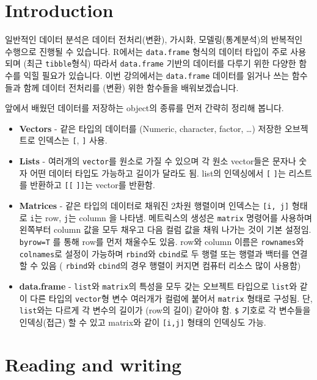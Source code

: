 \documentclass[
  a4paper,
]{book}
\providecommand{\tightlist}{%
  \setlength{\itemsep}{0pt}\setlength{\parskip}{0pt}}\usepackage{longtable,booktabs,array}
\begin{document}
\hypertarget{introduction-2}{%
\section{Introduction}\label{introduction-2}}

일반적인 데이터 분석은 데이터 전처리(변환), 가시화, 모델링(통계분석)의
반복적인 수행으로 진행될 수 있습니다. R에서는 \texttt{data.frame} 형식의
데이터 타입이 주로 사용되며 (최근 \texttt{tibble}형식) 따라서
\texttt{data.frame} 기반의 데이터를 다루기 위한 다양한 함수를 익힐
필요가 있습니다. 이번 강의에서는 \texttt{data.frame} 데이터를 읽거나
쓰는 함수들과 함께 데이터 전처리를 (변환) 위한 함수들을 배워보겠습니다.

앞에서 배웠던 데이터를 저장하는 object의 종류를 먼저 간략히 정리해
봅니다.

\begin{itemize}
\tightlist
\item
  \textbf{Vectors} - 같은 타입의 데이터를 (Numeric, character, factor,
  \ldots) 저장한 오브젝트로 인덱스는 \texttt{{[}}, \texttt{{]}} 사용.
\item
  \textbf{Lists} - 여러개의 \texttt{vector}를 원소로 가질 수 있으며 각
  원소 vector들은 문자나 숫자 어떤 데이터 타입도 가능하고 길이가 달라도
  됨. list의 인덱싱에서 \texttt{{[}} \texttt{{]}}는 리스트를 반환하고
  \texttt{{[}{[}} \texttt{{]}{]}}는 vector를 반환함.
\item
  \textbf{Matrices} - 같은 타입의 데이터로 채워진 2차원 행렬이며
  인덱스는 \texttt{{[}i,\ j{]}} 형태로 \texttt{i}는 row, \texttt{j}는
  column 을 나타냄. 메트릭스의 생성은 \texttt{matrix} 명령어를 사용하며
  왼쪽부터 column 값을 모두 채우고 다음 컬럼 값을 채워 나가는 것이 기본
  설정임. \texttt{byrow=T} 를 통해 row를 먼저 채울수도 있음. row와
  column 이름은 \texttt{rownames}와 \texttt{colnames}로 설정이 가능하며
  \texttt{rbind}와 \texttt{cbind}로 두 행렬 또는 행렬과 백터를 연결할 수
  있음 ( \texttt{rbind}와 \texttt{cbind}의 경우 행렬이 커지면 컴퓨터
  리소스 많이 사용함)
\item
  \textbf{data.frame} - \texttt{list}와 \texttt{matrix}의 특성을 모두
  갖는 오브젝트 타입으로 \texttt{list}와 같이 다른 타입의
  \texttt{vector}형 변수 여러개가 컬럼에 붙어서 \texttt{matrix} 형태로
  구성됨. 단, \texttt{list}와는 다르게 각 변수의 길이가 (row의 길이)
  같아야 함. \texttt{\$} 기호로 각 변수들을 인덱싱(접근) 할 수 있고
  matrix와 같이 \texttt{{[}i,j{]}} 형태의 인덱싱도 가능.
\end{itemize}

\hypertarget{reading-and-writing}{%
\section{Reading and writing}\label{reading-and-writing}}
\end{document}
